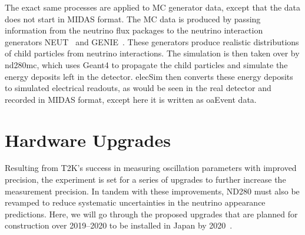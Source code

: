 \documentclass[aps,pra,12pt,notitlepage,tightenlines]{revtex4-1}
\begin{document}
The exact same processes are applied to MC generator data, except that the data does not start in MIDAS format. The MC data is produced by passing information from the neutrino flux packages to the neutrino interaction generators NEUT~\cite{Hayato:2009zz} and GENIE~\cite{Andreopoulos2010}. These generators produce realistic distributions of child particles from neutrino interactions. The simulation is then taken over by nd280mc, which uses Geant4 to propagate the child particles and simulate the energy deposits left in the detector. elecSim then converts these energy deposits to simulated electrical readouts, as would be seen in the real detector and recorded in MIDAS format, except here it is written as oaEvent data.
 
\section{Hardware Upgrades}
Resulting from T2K's success in measuring oscillation parameters with improved precision, the experiment is set for a series of upgrades to further increase the measurement precision. In tandem with these improvements, ND280 must also be revamped to reduce systematic uncertainties in the neutrino appearance predictions. Here, we will go through the proposed upgrades that are planned for construction over 2019--2020 to be installed in Japan by 2020~\cite{Blondel:2299599}.
\end{document}
